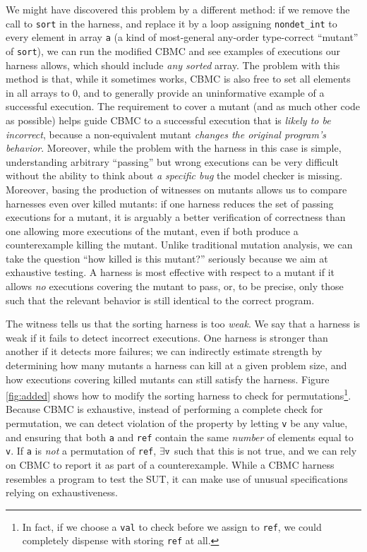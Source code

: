 \documentclass[conference]{IEEEtran}
\begin{document}
We might have discovered this problem by a different method: if we
remove the call to {\tt sort} in the harness, and replace it by a loop
assigning {\tt nondet\_int} to every element in array {\tt a} (a kind of
most-general any-order type-correct ``mutant'' of {\tt sort}), we can run
the modified CBMC and see examples of executions our harness allows,
which should include \emph{any sorted} array.  The problem with this
method is that, while it sometimes works, CBMC is also free to
set all elements in all arrays to 0, and to generally provide an
uninformative example of a successful execution.  The requirement to
cover a mutant (and as much other code as possible) helps guide CBMC
to a successful execution that is \emph{likely to be incorrect},
because a non-equivalent mutant \emph{changes the original program's behavior}.  Moreover, while the
problem with the harness in this case is simple, understanding
arbitrary ``passing'' but wrong executions can be very difficult
without the ability to think about \emph{a specific bug} the model
checker is missing.  Moreover, basing the production of witnesses on
mutants allows us to compare harnesses even over killed mutants:  if
one harness reduces the set of passing executions for a mutant, it is
arguably a better verification of correctness than one allowing more
executions of the mutant, even if both produce a counterexample
killing the mutant.  Unlike traditional mutation analysis, we can take
the question ``how killed is this mutant?'' seriously because we aim at
exhaustive testing.  A harness is most effective with respect to a
mutant if it allows \emph{no} executions covering the mutant to pass,
or, to be precise, only those such that the relevant behavior is still identical
to the correct program.

The witness tells us that the sorting harness is too \emph{weak}.  We
say that a harness is weak if it fails to detect incorrect executions.
One harness is stronger than another if it detects more failures; we
can indirectly estimate strength by determining how many mutants a
harness can kill at a given problem size, and how executions covering
killed mutants can still satisfy the harness.  Figure \ref{fig:added}
shows how to modify the sorting harness to check for permutations\footnote{In fact, if we choose a {\tt val} to check
  before we assign to {\tt ref}, we
  could completely dispense with storing {\tt ref} at all.}.  Because CBMC is exhaustive,
instead of performing a complete check for permutation, we can detect
violation of the property by letting {\tt v} be any value, and
ensuring that both {\tt a} and {\tt ref} contain the same
\emph{number} of elements equal to {\tt v}.  If {\tt a} is \emph{not}
a permutation of {\tt ref}, $\exists {\tt v}$ such that this is not
true, and we can rely on CBMC to report it as part of a
counterexample.  While a CBMC harness
resembles a program to test the SUT, it can make use of unusual specifications
relying on exhaustiveness.
\end{document}
